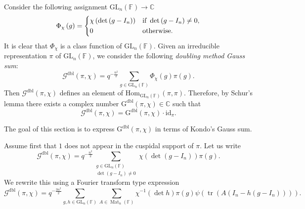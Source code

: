 \documentclass[12pt, reqno]{amsart}
\theoremstyle{definition}
\theoremstyle{definition}
\theoremstyle{definition}
\newcommand{\cComplex}{\mathbb{C}}
\newcommand{\Hom}{\mathrm{Hom}}
\newcommand{\idmap}{\mathrm{id}}
\newcommand{\fieldCharacter}{\psi}
\newcommand{\IdentityMatrix}[1]{I_{#1}}
\newcommand{\trace}{\operatorname{tr}}
\newcommand{\GL}{\mathrm{GL}}
\newcommand{\finiteField}{\mathbb{F}}
\newcommand{\squareMatrix}{\operatorname{Mat}}
\newcommand{\dblGaussSum}[2]{\mathcal{G}^{\mathrm{dbl}}\left(#1, #2\right)}
\newcommand{\dblGaussSumScalar}[2]{\mathrm{G}^{\mathrm{dbl}}\left(#1, #2\right)}
\begin{document}
Consider the following assignment $\GL_n\left(\finiteField\right) \to \cComplex$
$$\Phi_{\chi}\left(g\right) = \begin{dcases}
	\chi\left(\det\left(g-\IdentityMatrix{n}\right)\right) & \text{if }\det\left(g-\IdentityMatrix{n}\right) \ne 0,\\
	0 & \text{otherwise.}
\end{dcases}$$
It is clear that $\Phi_{\chi}$ is a class function of $\GL_n\left(\finiteField\right)$. Given an irreducible representation $\pi$ of $\GL_n\left(\finiteField\right)$, we consider the following \emph{doubling method Gauss sum}:
$$\dblGaussSum{\pi}{\chi} = q^{-\frac{n^2}{2}} \sum_{g \in \GL_n\left(\finiteField\right)} \Phi_{\chi}\left(g\right) \pi\left(g\right).$$
Then $\dblGaussSum{\pi}{\chi}$ defines an element of $\Hom_{\GL_n\left(\finiteField\right)}\left(\pi, \pi\right)$. Therefore, by Schur's lemma there exists a complex number $\dblGaussSumScalar{\pi}{\chi} \in \cComplex$ such that $$\dblGaussSum{\pi}{\chi} = \dblGaussSumScalar{\pi}{\chi} \cdot \idmap_\pi.$$ 

The goal of this section is to express $\dblGaussSumScalar{\pi}{\chi}$ in terms of Kondo's Gauss sum.

Assume first that $1$ does not appear in the cuspidal support of $\pi$. Let us write
$$\dblGaussSum{\pi}{\chi} = q^{-\frac{n^2}{2}} \sum_{\substack{g \in \GL_n\left(\finiteField\right) \\
\det\left(g - \IdentityMatrix{n}\right) \ne 0}} \chi\left(\det\left(g - \IdentityMatrix{n}\right)\right) \pi\left(g\right).$$
We rewrite this using a Fourier transform type expression
$$\dblGaussSum{\pi}{\chi} = q^{-\frac{3n^2}{2}} \sum_{g, h \in \GL_n\left(\finiteField\right)} \sum_{A \in \squareMatrix_n\left(\finiteField\right)} \chi^{-1}\left(\det h\right) \pi\left(g\right) \fieldCharacter\left(\trace\left(A \left(\IdentityMatrix{n} - h \left(g - \IdentityMatrix{n}\right)\right)\right)\right).$$
\end{document}
